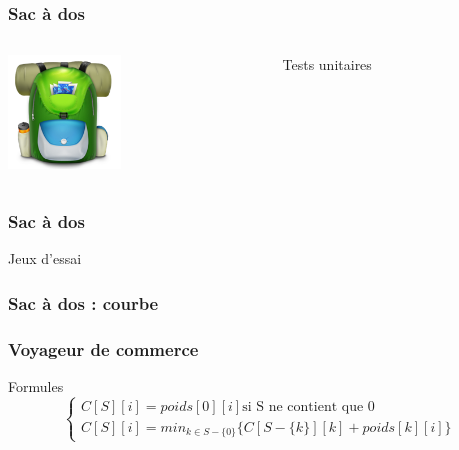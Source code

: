 \documentclass[french]{beamer}
\begin{document}
\begin{frame}
  \frametitle{Sac à dos}
  \begin{columns}
    \begin{column}[]{5cm}
      \begin{center}
        \includegraphics[height=3cm]{Knapsack.png}
      \end{center}
    \end{column}
      \begin{column}[]{5cm}
        \begin{block}{Tests unitaires}
        \end{block}
      \end{column}
    \end{columns}
  \end{frame}


  \begin{frame}
    \frametitle{Sac à dos}
    \begin{block}{Jeux d'essai}

    \end{block}
  \end{frame}

  \begin{frame}
    \frametitle{Sac à dos : courbe}
  \end{frame}

  \begin{frame}
    \frametitle{Voyageur de commerce}
    \begin{alertblock}{Formules}
      \begin{equation}
        \begin{cases}
          C[S][i] = poids[0][i] \text{si S ne contient que $0$} \\
          C[S][i] = min_{k \in S - \{ 0 \}} \{ C[S- \{ k \}][k] + poids[k][i]  \}
        \end{cases}
      \end{equation}
    \end{alertblock}
  \end{frame}
\end{document}
